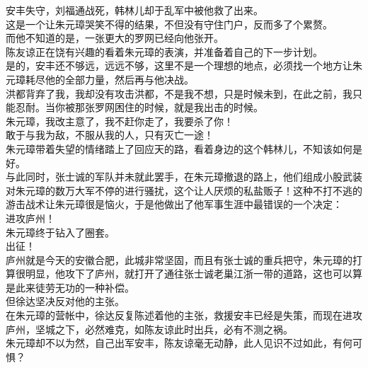 \begin{multicols}{\theparacolNo}
安丰失守，刘福通战死，韩林儿却于乱军中被他救了出来。\\

这是一个让朱元璋哭笑不得的结果，不但没有守住门户，反而多了个累赘。\\

而他不知道的是，一张更大的罗网已经向他张开。\\

陈友谅正在饶有兴趣的看着朱元璋的表演，并准备着自己的下一步计划。\\

是的，安丰还不够远，远远不够，这里不是一个理想的地点，必须找一个地方让朱元璋耗尽他的全部力量，然后再与他决战。\\

洪都背弃了我，我却没有攻击洪都，不是我不想，只是时候未到，在此之前，我只能忍耐。当你被那张罗网困住的时候，就是我出击的时候。\\

朱元璋，我改主意了，我不赶你走了，我要杀了你！\\

敢于与我为敌，不服从我的人，只有灭亡一途！\\

朱元璋带着失望的情绪踏上了回应天的路，看着身边的这个韩林儿，不知该如何是好。\\

与此同时，张士诚的军队并未就此罢手，在朱元璋撤退的路上，他们组成小股武装对朱元璋的数万大军不停的进行骚扰，这个让人厌烦的私盐贩子！这种不打不逃的游击战术让朱元璋很是恼火，于是他做出了他军事生涯中最错误的一个决定：\\

进攻庐州！\\

朱元璋终于钻入了圈套。\\

出征！\\

庐州就是今天的安徽合肥，此城非常坚固，而且有张士诚的重兵把守，朱元璋的打算很明显，他攻下了庐州，就打开了通往张士诚老巢江浙一带的道路，这也可以算是此来徒劳无功的一种补偿。\\

但徐达坚决反对他的主张。\\

在朱元璋的营帐中，徐达反复陈述着他的主张，救援安丰已经是失策，而现在进攻庐州，坚城之下，必然难克，如陈友谅此时出兵，必有不测之祸。\\

朱元璋却不以为然，自己出军安丰，陈友谅毫无动静，此人见识不过如此，有何可惧？\\


\end{multicols}
